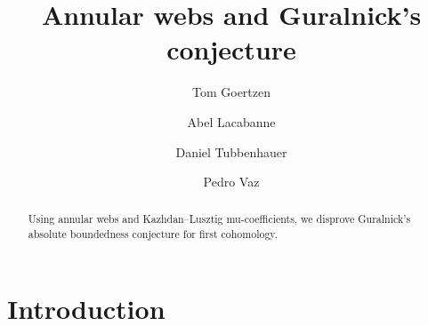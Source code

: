 \documentclass[a4paper,11pt]{amsart}
\numberwithin{equation}{subsection}
\theoremstyle{plain}
\theoremstyle{definition}
\theoremstyle{remark}
\begin{document}
\title[Annular webs and Guralnick's conjecture]{Annular webs and Guralnick's conjecture}
\author{Tom Goertzen}
\address{T.G.: The University of Sydney,
School of Mathematics and Statistics F07,
NSW 2006, Australia,
\href{https://profiles.sydney.edu.au/tom.goertzen}
{profiles.sydney.edu.au/tom.goertzen},
\href{https://orcid.org/0009-0003-3399-3416}
{ORCID 0009-0003-3399-3416}}

\author{Abel Lacabanne}
\address{A.L.: Laboratoire de Math\'ematiques Blaise Pascal (UMR 6620),
Universit\'e Clermont Auvergne,
Campus Universitaire des C\'ezeaux, 3 place Vasarely,
63178 Aubi\`ere Cedex, France,
\href{https://www.normalesup.org/~lacabanne/}
{www.normalesup.org/\textasciitilde lacabanne},
\href{https://orcid.org/0000-0001-8691-3270}
{ORCID 0000-0001-8691-3270}}

\author{Daniel Tubbenhauer}
\address{D.T.: The University of Sydney,
School of Mathematics and Statistics F07,
Office Carslaw 827, NSW 2006, Australia,
\href{http://www.dtubbenhauer.com}
{www.dtubbenhauer.com},
\href{https://orcid.org/0000-0001-7265-5047}
{ORCID 0000-0001-7265-5047}}

\author{Pedro Vaz}
\address{P.V.: Institut de Recherche en Math\'ematique et Physique,
Universit\'e catholique de Louvain,
Chemin du Cyclotron 2, 1348 Louvain-la-Neuve, Belgium,
\href{https://perso.uclouvain.be/pedro.vaz/}
{perso.uclouvain.be/pedro.vaz},
\href{https://orcid.org/0000-0001-9422-4707}
{ORCID 0000-0001-9422-4707}}
\date{}

\begin{abstract}
Using annular webs and Kazhdan--Lusztig mu-coefficients, we disprove Guralnick’s absolute boundedness conjecture for first cohomology.
\end{abstract}


\maketitle
\tableofcontents

\section{Introduction}
\end{document}
